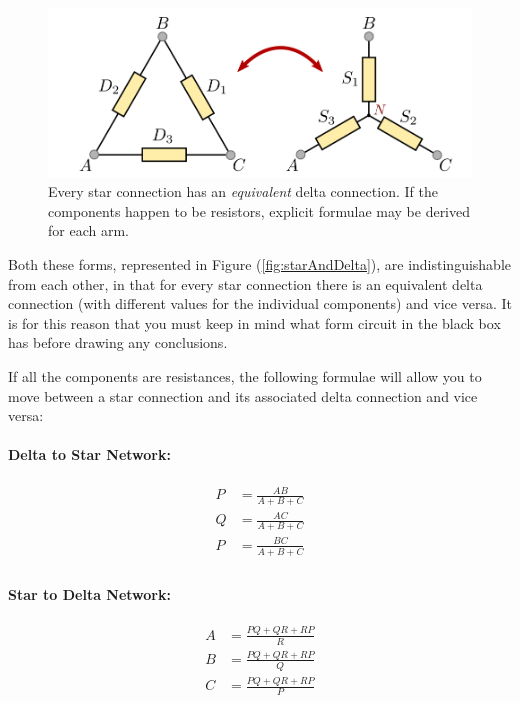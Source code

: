 \begin{figure}[!htb]
\centering
\includegraphics[scale=0.4]{figs/bb-starToDelta.png}
\caption{Every star connection has an \textit{equivalent} delta connection. If the components happen to be resistors, explicit formulae may be derived for each arm.}
\label{fig:starToDelta}
\end{figure}

 Both these forms, represented in Figure (\ref{fig:starAndDelta}), are indistinguishable from each other, in that for every star connection there is an equivalent delta connection (with different values for the individual components) and vice versa. It is for this reason that you must keep in mind what form circuit in the black box has before drawing any conclusions.

\begin{imp}
If all the components are resistances, the following formulae will allow you to move between a star connection and its associated delta connection and vice versa:

\begin{minipage}{0.5\textwidth}
\centering
\paragraph*{Delta to Star Network:}
\begin{equation*}
\begin{aligned}
P &= \frac{A B}{A + B + C}\\
Q &= \frac{A C}{A + B + C}\\
P &= \frac{B C}{A + B + C}\\
\end{aligned}
\end{equation*}
\end{minipage}
\begin{minipage}{0.5\textwidth}
\centering
\paragraph*{Star to Delta Network:}
\begin{equation*}
\begin{aligned}
A &= \frac{P Q + Q R + R P}{R}\\
B &= \frac{P Q + Q R + R P}{Q}\\
C &= \frac{P Q + Q R + R P}{P}\\
\end{aligned}
\end{equation*}

\end{minipage}

\end{imp}

